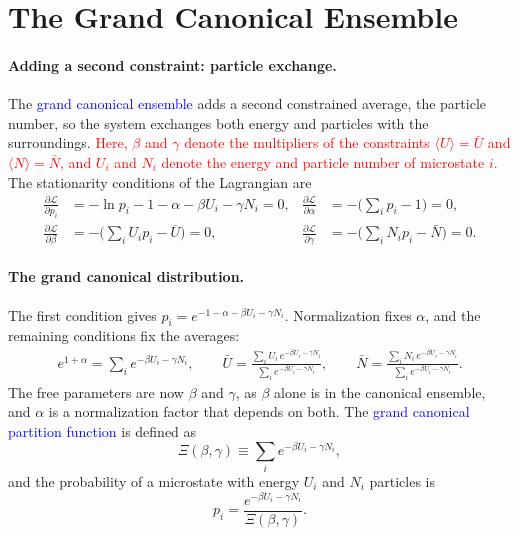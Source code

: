 \section{The Grand Canonical Ensemble}

\paragraph{Adding a second constraint: particle exchange.}
The \textcolor{blue}{grand canonical ensemble} adds a second constrained
average, the particle number, so the system exchanges both energy and
particles with the surroundings.
\textcolor{red}{Here, $\beta$ and $\gamma$ denote the multipliers of the
constraints $\langle U\rangle=\bar U$ and $\langle N\rangle=\bar N$, and
$U_i$ and $N_i$ denote the energy and particle number of microstate $i$.}
The stationarity conditions of the Lagrangian are
\begin{align*}
    \frac{\partial\mathcal{L}}{\partial p_i}
    &= -\ln p_i-1-\alpha-\beta U_i-\gamma N_i=0,
    &\frac{\partial\mathcal{L}}{\partial\alpha}
    &= -\Big(\sum_i p_i-1\Big)=0,\\
    \frac{\partial\mathcal{L}}{\partial\beta}
    &= -\Big(\sum_i U_i p_i-\bar U\Big)=0,
    &\frac{\partial\mathcal{L}}{\partial\gamma}
    &= -\Big(\sum_i N_i p_i-\bar N\Big)=0.
\end{align*}

\paragraph{The grand canonical distribution.}
The first condition gives $p_i=e^{-1-\alpha-\beta U_i-\gamma N_i}$.
Normalization fixes $\alpha$, and the remaining conditions fix the averages:
\begin{align*}
    e^{1+\alpha}=\sum_i e^{-\beta U_i-\gamma N_i},
    \qquad
    \bar U=\frac{\sum_i U_i\,e^{-\beta U_i-\gamma N_i}}{\sum_i e^{-\beta U_i-\gamma N_i}},
    \qquad
    \bar N=\frac{\sum_i N_i\,e^{-\beta U_i-\gamma N_i}}{\sum_i e^{-\beta U_i-\gamma N_i}}.
\end{align*}
The free parameters are now $\beta$ and $\gamma$, as $\beta$ alone is in the
canonical ensemble, and $\alpha$ is a normalization factor that depends on
both. The
\textcolor{blue}{grand canonical partition function} is defined as
\begin{equation}
    \boxed{\Xi(\beta,\gamma)\equiv\sum_i e^{-\beta U_i-\gamma N_i},}
\end{equation}
and the probability of a microstate with energy $U_i$ and $N_i$ particles is
\begin{equation}
    \boxed{p_i=\frac{e^{-\beta U_i-\gamma N_i}}{\Xi(\beta,\gamma)}.}
\end{equation}

